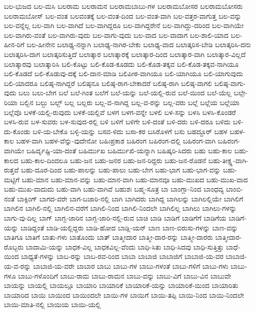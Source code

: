 {ಬಲ-ಭುಜದ
ಬಲ-ಮಸಿ
ಬಲರಾಮ
ಬಲರಾಮನ
ಬಲರಾಮಬಾಬು-ಗಳ
ಬಲರಾಮಬೋಸರ
ಬಲರಾಮಬೋಸರು
ಬಲರಾಮಬೋಸ್
ಬಲ-ವಂತ
ಬಲವಂತಕ್ಕೆ
ಬಲ-ವಂತ-ದಿಂದ
ಬಲ-ವಂತ-ವಾಗಿ
ಬಲ-ವತ್ತರ-ವಾಗುತ್ತ
ಬಲ-ವನ್ನು
ಬಲ-ವನ್ನೆಲ್ಲ
ಬಲ-ವಾಗಿ
ಬಲ-ವಾಗಿದೆ
ಬಲ-ವಾಗಿದ್ದರೂ
ಬಲ-ವಾಗಿದ್ದರೇನೆ
ಬಲ-ವಾಗಿದ್ದು-ದರಿಂದ
ಬಲ-ವಾಗಿಯೇ
ಬಲ-ವಾಗಿರು-ವಂತೆ
ಬಲ-ವಾಗಿರು-ವುದು
ಬಲ-ವಾಗು-ವುದು
ಬಲ-ವಾದ
ಬಲ-ವಾದಾಗ
ಬಲ-ಶಾಲಿ-ಯಾದ
ಬಲ-ಹೀನ-ರಿಗೆ
ಬಲ-ಹೀನೇನ
ಬಲಾಢ್ಯ-ನನ್ನಾಗಿ
ಬಲಾಢ್ಯ-ನಾಗಿರ-ಬೇಕು
ಬಲಾಢ್ಯ-ವಾದ
ಬಲಾತ್ಕರಿಸ-ಬೇಡಿ
ಬಲಾತ್ಕರಿಸಿ-ದನು
ಬಲಾತ್ಕರಿಸಿ-ದಾಗ
ಬಲಾತ್ಕರಿಸುತ್ತಿದೆ
ಬಲಾತ್ಕಾರ
ಬಲಾತ್ಕಾರಕ್ಕೆ
ಬಲಾತ್ಕಾರ-ದಿಂದ
ಬಲಾತ್ಕಾರ-ವಾಗಿ
ಬಲಾತ್ಕಾರ-ವಿಲ್ಲದೆ
ಬಲಾತ್ಕಾರವು
ಬಲಾತ್ಕಾರಿಸಿ
ಬಲಿ-ಕೊಟ್ಟು
ಬಲಿ-ಕೊಡ-ಕೂಡದು
ಬಲಿ-ಕೊಡ-ತಕ್ಕವ
ಬಲಿ-ಕೊಡ-ತಕ್ಕವ-ನಾಗಿಯೂ
ಬಲಿ-ಕೊಡದೆ
ಬಲಿ-ಕೊಡುವು-ದಕ್ಕೆ
ಬಲಿ-ದಾನ-ಮಾಡಿ
ಬಲಿಪೀಠ-ವಾಗಿಯೂ
ಬಲಿ-ಯಾಗಿಯೂ
ಬಲಿ-ಯಾಗುವುದು
ಬಲಿ-ಯಾದರೂ
ಬಲಿಷ್ಠ-ನಾಗಿದ್ದರೆ
ಬಲಿಷ್ಠನೂ
ಬಲಿಷ್ಠ-ರಾಗ-ಬೇಕಾದರೆ
ಬಲಿಷ್ಠ-ರಾಗಿ
ಬಲಿಷ್ಠ-ವಾಗಲಿ
ಬಲಿಷ್ಠ-ವಾಗು-ವುದು
ಬಲು
ಬಲು-ಬೇಗ
ಬಲೆ
ಬಲೆ-ಗಿಂತ
ಬಲೆಗೆ
ಬಲೆ-ಯನ್ನು
ಬಲೆ-ಯಲ್ಲಿ-ರುವ
ಬಲೆ-ಯಿಂದ
ಬಲೆ-ಯೆಲ್ಲ
ಬಲ್ಗೇ-ರಿಯಾ
ಬಲ್ಬಿನ
ಬಲ್ಬು
ಬಲ್ಬ್
ಬಲ್ಲ
ಬಲ್ಲರು
ಬಲ್ಲ-ವ-ನಾಗಿದ್ದ
ಬಲ್ಲ-ವ-ರನ್ನು
ಬಲ್ಲ-ವರು
ಬಲ್ಲೆ
ಬಲ್ಲೆಯ
ಬಲ್ಲೆಯಾ
ಬಲ್ಲೆವೊ
ಬಳಕೆ-ಯಲ್ಲಿ-ರುವುದು
ಬಳಕೆ-ಯಲ್ಲಿವೆ
ಬಳಗ
ಬಳಗ-ವನ್ನೇ
ಬಳಲಿ
ಬಳ-ಸನ್ನು
ಬಳಸಿ
ಬಳಸಿ-ಕೊಂಡರೆ
ಬಳಸಿ-ರುವ
ಬಳ-ಸುವರು
ಬಳ-ಸುವುದ-ರಲ್ಲಿ
ಬಳಿ
ಬಳಿಗೆ
ಬಳಿಗೇ
ಬಳಿ-ದಂತೆ
ಬಳಿ-ದರು
ಬಳಿ-ದರೂ
ಬಳಿದು
ಬಳಿ-ದು-ಕೊಂಡು
ಬಳಿ-ಯ-ಬೇಕೊ
ಬಳ್ಳಿ-ಯನ್ನು
ಬಸವ-ಳಿದು
ಬಸಾ-ಕರ
ಬಸಿರೊಳಗೆ
ಬಸು
ಬಹದ್ದೂರ್
ಬಹಳ
ಬಹಳ-ಕಾಲ
ಬಹಳ-ವಾಗಿ
ಬಹಳ-ವೆನ್ನು-ವುದೇನೋ
ಬಹಿಃಪ್ರಕಾಶ
ಬಹಿರಂಗ
ಬಹಿರಂಗ-ದಲ್ಲಿ
ಬಹಿರಂಗ-ವಾಗಿ
ಬಹಿರಂಗ-ವಾಗಿಯೇ
ಬಹಿರ್ದೃಷ್ಟಿ-ಯಾ-ದಂತೆ
ಬಹಿರ್ಮುಖ
ಬಹಿರ್ಮುಖಿ-ಯನ್ನಾಗಿ
ಬಹಿಷ್ಕರಿ-ಸಿದರು
ಬಹು
ಬಹು-ಕಾಲ
ಬಹು-ಕಾಲದ
ಬಹು-ಕಾಲ-ದಿಂದಲೂ
ಬಹು-ಜನ
ಬಹು-ಜನರ
ಬಹು-ಜನ-ರಿದ್ದರು
ಬಹು-ಜನ-ರೊಡನೆ
ಬಹು-ತೀಕ್ಷ್ಣ-ವಾಗಿ-ರುತ್ತವೆ
ಬಹು-ದೂರ-ದಿಂದ
ಬಹು-ಪಾಲನ್ನು
ಬಹು-ಪಾಲು
ಬಹು-ಬೇಗ
ಬಹು-ಭಾಗ
ಬಹು-ಭಾಗ-ವನ್ನು
ಬಹು-ಮಟ್ಟಿಗೆ
ಬಹು-ಮಾನ
ಬಹು-ಮಾನ-ವನ್ನು
ಬಹು-ಮಾನ-ವಾಗಿ
ಬಹು-ಮಾನವೂ
ಬಹು-ಮುಖದ
ಬಹು-ಮುಖ-ವಾದ
ಬಹು-ಮುಖ-ವಾದುದು
ಬಹು-ವಾಗಿ
ಬಹು-ವಾಗಿವೆ
ಬಹುಶಃ
ಬಹ್ಮ-ಸೂತ್ರ
ಬಾ
ಬಾಂಗ್ಲಾ-ನಿಂದ
ಬಾಂಧವ್ಯ
ಬಾಂಬಿ-ನಂತೆ
ಬಾಕ್ಸಿಂಗ್
ಬಾಗದ-ವರೇ
ಬಾಗ-ಬಜಾರಿ-ನಲ್ಲಿ
ಬಾಗಿ
ಬಾಗಿದರು
ಬಾಗಿದ್ದ
ಬಾಗಿಲನ್ನು
ಬಾಗಿಲಲ್ಲಿಯೇ
ಬಾಗಿಲಿಗೆ
ಬಾಗಿಲಿನ
ಬಾಗಿಲಿ-ನಲ್ಲಿ
ಬಾಗಿಲಿನ-ವರೆಗೆ
ಬಾಗಿಲಿ-ನಿಂದ
ಬಾಗಿಲಿ-ನಿಂದಲೇ
ಬಾಗಿಲಿಲ್ಲ
ಬಾಗಿಲು
ಬಾಗಿಲು-ಗಳನ್ನು
ಬಾಗು-ವು-ದಿಲ್ಲ
ಬಾಗ್
ಬಾಗ್ಬ-ಜಾರಿನ
ಬಾಗ್ಬ-ಜಾರಿ-ನಲ್ಲಿ-ರುವ
ಬಾಚಿ
ಬಾಡಿ
ಬಾಡಿಗೆ
ಬಾಡಿಗೆಗೆ
ಬಾಡಿಗೆಯ
ಬಾಡಿಗೆ-ಯನ್ನು
ಬಾಡಿದ್ದಂತೆ
ಬಾಡಿ-ಯಲ್ಲಿದ್ದರು
ಬಾಡಿ-ಹೋದ
ಬಾಡ್ಲಿ-ಯನ್
ಬಾಣ
ಬಾಣ-ಬಿರುಸು-ಗಳನ್ನು
ಬಾಣ-ವನ್ನು
ಬಾತಿಗೂ
ಬಾತಿಗೆ
ಬಾತು-ಗಳು
ಬಾತೊಂದು
ಬಾತ್
ಬಾತ್ಮೀದಾರ
ಬಾತ್ಮೀ-ದಾರ-ರನ್ನು
ಬಾತ್ಮೀ-ದಾರರು
ಬಾತ್ಮೀದಾರ-ರೊಬ್ಬರು
ಬಾದಾಮಿ-ಯನ್ನು
ಬಾಧಕ-ವಿಲ್ಲ
ಬಾಧಕವಿಲ್ಲ-ವೆಂದು
ಬಾಧಿ-ಸಿತು
ಬಾಧಿ-ಸಿದವು
ಬಾಧಿ-ಸುತ್ತಿತ್ತು
ಬಾಧೆ-ಯಿಂದ
ಬಾಧ್ಯತೆ-ಗಳನ್ನು
ಬಾಬ-ರನ್ನು
ಬಾಬ-ರವ-ರಿಂದ
ಬಾಬಾ
ಬಾಬಾಜಿ
ಬಾಬಾಜಿಗೆ
ಬಾಬಾಜಿ-ಯ-ವರ
ಬಾಬಾಜಿ-ಯ-ವ-ರನ್ನು
ಬಾಬಾಜಿ-ಯ-ವರೇ
ಬಾಬಾರ
ಬಾಬು
ಬಾಬು-ಗಳ
ಬಾಬು-ಗಳಂತೆ
ಬಾಬು-ಗಳಿಗೆ
ಬಾಬು-ಗಳು
ಬಾಬು-ಗಳೂ
ಬಾಬು-ಗಳೊಂದಿಗೆ
ಬಾಬು-ರಾಮ
ಬಾಬು-ರಾಮನ
ಬಾಬು-ವನ್ನು
ಬಾಬು-ವಿಗೆ
ಬಾಬು-ವಿನ
ಬಾಬುವೇ
ಬಾಯನ್ನು
ಬಾಯಲ್ಲಿ
ಬಾಯಲ್ಲೂ
ಬಾಯಾರಿ
ಬಾಯಾರಿಕೆ
ಬಾಯಾರಿಕೆ-ಯನ್ನು
ಬಾಯಾರಿಕೆ-ಯಿಂದ
ಬಾಯಾರಿತು
ಬಾಯಾರಿದ
ಬಾಯಿ
ಬಾಯಿಂದ
ಬಾಯಿಂದಲೇ
ಬಾಯಿ-ಗಳ
ಬಾಯಿಗೆ
ಬಾಯಿ-ತಪ್ಪಿ
ಬಾಯಿ-ನಿಂದ
ಬಾಯಿ-ನಿಂದಲೇ
ಬಾಯಿ-ಮಾತಿ-ನಲ್ಲಿ
ಬಾಯಿಯ
ಬಾಯಿ-ಯಲ್ಲಿ
}
